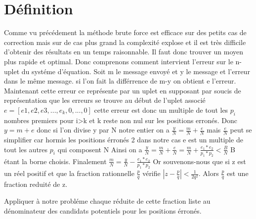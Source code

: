 \documentclass[a4paper, 11pt]{report}
\begin{document}
\section{Définition}
Comme vu précédement la méthode brute force est efficace sur des petits cas de correction mais sur de cas plus grand la complexité explose et il est très difficile d'obtenir des résultats en un temps raisonnable.\newline
Il faut donc trouver un moyen plus rapide et optimal. Donc comprenons comment intervient l'erreur sur le n-uplet du systéme d'équation.\newline
Soit m le message envoyé et y le message et l'erreur dans le même message. si l'on fait la différrence de m-y on obtient e l'erreur.
Maintenant cette erreur ce représente par un uplet en supposant par soucis de représentation que les erreurs se trouve au début de l'uplet associé
$e = [e1,e2,e3,...,e_k,0,...,0]$ cette erreur est donc un multiple de tout les $p_i$ nombres premiers pour i>k et k  reste non nul sur les positions erronés.\newline
Donc $y = m + e$ donc si l'on divise y par N notre entier on a $\frac{y}{N}=\frac{m}{N}+\frac{e}{N}$\newline
mais $\frac{e}{N}$ peut se simplifier car hormis les positions érronés 2 dans notre cas e est un multiple de tout les autres $p_i$ qui composent N\newline
Ainsi on a  $\frac{y}{N}=\frac{m}{N}+\frac{e}{N}=\frac{m}{N}+ \frac{e_1 * e_2}{p_1 * p_2 } <\frac{B}{N} $    B étant la borne choisis.\newline
Finalement $\frac{m}{N}=\frac{y}{N} - \frac{e_1 * e_2}{p_1 * p_2 } $ \newline
\newline
Or souvenons-nous que si z est un réel positif et que la fraction rationnelle $\frac{p}{q}$
vérifie $ \left| z - \frac{p}{q} \right| < \frac{1}{2q^2} $. 
Alors $\frac{p}{q}$ est une fraction reduité de z.\newline
\newline

Appliquer à notre probléme chaque réduite de cette fraction liste au dénominateur des candidats potentiels pour les positions érronés.\newline
\end{document}
